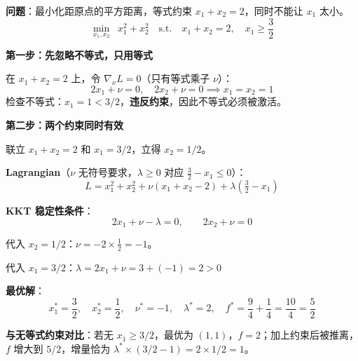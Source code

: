 \documentclass[12pt, a4paper]{ctexart}
\begin{document}
\begin{blackboard}

\textbf{问题}：最小化距原点的平方距离，等式约束 $x_1+x_2=2$，同时不能让 $x_1$ 太小。
\[
\min_{x_1, x_2} \;\; x_1^2 + x_2^2 \quad \text{s.t.} \quad x_1 + x_2 = 2, \quad x_1 \geq \frac{3}{2}
\]

\textbf{第一步：先忽略不等式，只用等式}

在 $x_1+x_2=2$ 上，令 $\nabla_x L=0$（只有等式乘子 $\nu$）：
\[
2x_1 + \nu = 0, \quad 2x_2 + \nu = 0 \implies x_1 = x_2 = 1
\]
检查不等式：$x_1 = 1 < 3/2$，\textbf{违反约束}，因此不等式必须被激活。

\textbf{第二步：两个约束同时有效}

联立 $x_1 + x_2 = 2$ 和 $x_1 = 3/2$，立得 $x_2 = 1/2$。

\textbf{Lagrangian}（$\nu$ 无符号要求，$\lambda \geq 0$ 对应 $\frac{3}{2} - x_1 \leq 0$）：
\[
L = x_1^2 + x_2^2 + \nu(x_1 + x_2 - 2) + \lambda\!\left(\tfrac{3}{2} - x_1\right)
\]

\textbf{KKT 稳定性条件}：
\[
2x_1 + \nu - \lambda = 0, \qquad 2x_2 + \nu = 0
\]

代入 $x_2 = 1/2$：$\nu = -2 \times \frac{1}{2} = -1$。

代入 $x_1 = 3/2$：$\lambda = 2x_1 + \nu = 3 + (-1) = 2 > 0$ \checkmark

\textbf{最优解}：
\[
x_1^* = \frac{3}{2},\quad x_2^* = \frac{1}{2},\quad \nu^* = -1,\quad \lambda^* = 2, \quad f^* = \frac{9}{4}+\frac{1}{4} = \frac{10}{4} = \frac{5}{2}
\]

\textbf{与无等式约束对比}：若无 $x_1 \geq 3/2$，最优为 $(1,1)$，$f=2$；加上约束后被推离，$f$ 增大到 $5/2$，增量恰为 $\lambda^* \times (3/2 - 1) = 2 \times 1/2 = 1$。

\end{blackboard}
\end{document}
